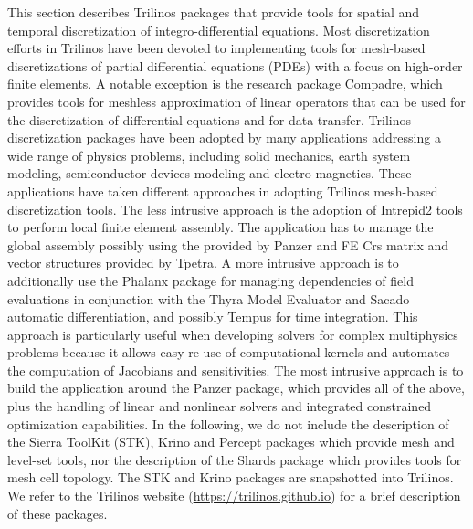 
This section describes Trilinos packages that provide tools for spatial and temporal discretization of integro-differential equations. Most discretization efforts in Trilinos have been devoted to implementing tools for mesh-based discretizations of partial differential equations (PDEs) with a focus on high-order finite elements. A notable exception is the research package Compadre, which provides tools for meshless approximation of linear operators that can be used for the discretization of differential equations and for data transfer.
Trilinos discretization packages have been adopted by many applications addressing a wide range of physics problems, including solid mechanics, earth system modeling, semiconductor devices modeling and electro-magnetics. These applications have taken different approaches in adopting Trilinos mesh-based discretization tools. The less intrusive approach is the adoption of Intrepid2 tools to perform local finite element assembly. The application has to manage the global assembly possibly using the  provided by Panzer and FE Crs matrix and vector structures provided by Tpetra.
A more intrusive approach is to additionally use the Phalanx package for managing dependencies of field evaluations in conjunction with the Thyra Model Evaluator and Sacado automatic differentiation, and possibly Tempus for time integration. This approach is particularly useful when developing solvers for complex multiphysics problems because it allows easy re-use of computational kernels and automates the computation of Jacobians and sensitivities.
The most intrusive approach is to build the application around the Panzer package, which provides all of the above, plus the handling of linear and nonlinear solvers and integrated constrained optimization capabilities.
In the following, we do not include the description of the Sierra ToolKit (STK), Krino and Percept packages which provide mesh and level-set tools, nor the description of the Shards package which provides tools for mesh cell topology.
The STK and Krino packages are snapshotted into Trilinos.
We refer to the Trilinos website (\url{https://trilinos.github.io}) for a brief description of these packages.

